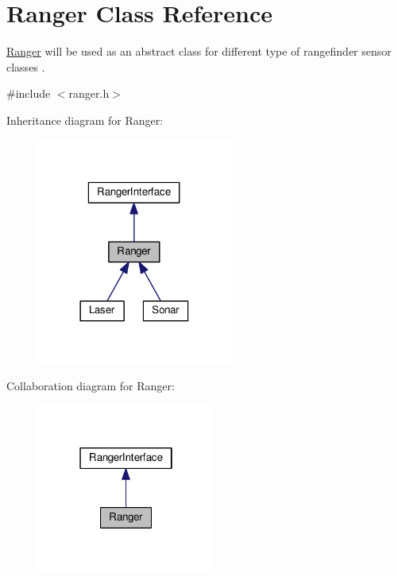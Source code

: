 \hypertarget{class_ranger}{}\section{Ranger Class Reference}
\label{class_ranger}


\hyperlink{class_ranger}{Ranger} will be used as an abstract class for different type of rangefinder sensor classes .  




{\ttfamily \#include $<$ranger.\+h$>$}



Inheritance diagram for Ranger\+:
\nopagebreak
\begin{figure}[H]
\begin{center}
\leavevmode
\includegraphics[width=182pt]{class_ranger__inherit__graph}
\end{center}
\end{figure}


Collaboration diagram for Ranger\+:
\nopagebreak
\begin{figure}[H]
\begin{center}
\leavevmode
\includegraphics[width=166pt]{class_ranger__coll__graph}
\end{center}
\end{figure}
